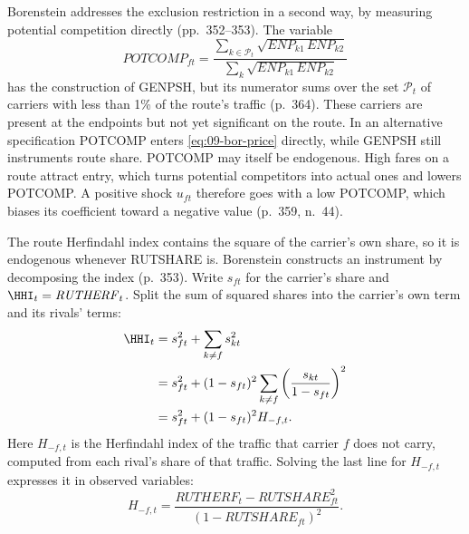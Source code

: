  Borenstein addresses the exclusion restriction in a second way, by measuring
potential competition directly (pp.~352--353). The variable
\begin{equation}\label{eq:09-bor-potcomp}
\mathit{POTCOMP}_{ft} = \frac{\sum_{k \in \mathcal{P}_t} \sqrt{\mathit{ENP}_{k1}\, \mathit{ENP}_{k2}}}
{\sum_{k} \sqrt{\mathit{ENP}_{k1}\, \mathit{ENP}_{k2}}}
\end{equation}
has the construction of GENPSH, but its numerator sums over the set $\mathcal{P}_t$ of carriers with less than
1\% of the route's traffic (p.~364). These carriers are present at the endpoints but not yet significant on the
route. In an alternative specification POTCOMP enters \cref{eq:09-bor-price} directly, while GENPSH still
instruments route share. POTCOMP may itself be endogenous. High fares on a route attract entry, which turns
potential competitors into actual ones and lowers POTCOMP. A positive shock $u_{ft}$ therefore goes with a low
POTCOMP, which biases its coefficient toward a negative value (p.~359, n.~44).

 The route Herfindahl index contains the square of the
carrier's own share, so it is endogenous whenever RUTSHARE is. Borenstein constructs an instrument by
decomposing the index (p.~353). Write $s_{ft}$ for the carrier's share and $\HHI_t = \mathit{RUTHERF}_t$. Split
the sum of squared shares into the carrier's own term and its rivals' terms:
\begin{align*}
\HHI_t &= s_{ft}^2 + \sum_{k \neq f} s_{kt}^2 \\
&= s_{ft}^2 + (1 - s_{ft})^2 \sum_{k \neq f} \left(\frac{s_{kt}}{1 - s_{ft}}\right)^2 \\
&= s_{ft}^2 + (1 - s_{ft})^2 H_{-f,t} .
\end{align*}
Here $H_{-f,t}$ is the Herfindahl index of the traffic that carrier $f$ does not carry, computed from each
rival's share of that traffic. Solving the last line for $H_{-f,t}$ expresses it in observed variables:
\begin{equation*}
H_{-f,t} = \frac{\mathit{RUTHERF}_t - \mathit{RUTSHARE}_{ft}^2}{(1 - \mathit{RUTSHARE}_{ft})^2} .
\end{equation*}

